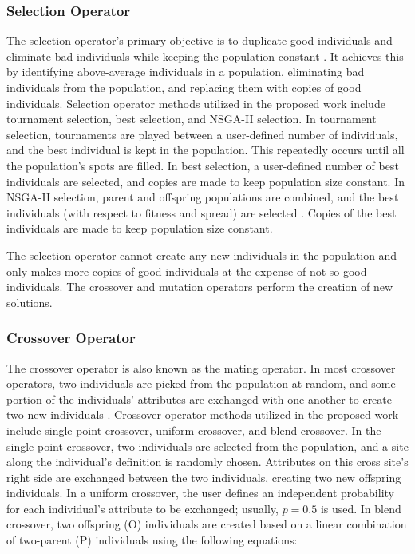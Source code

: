 \subsubsection{Selection Operator}
The selection operator's primary objective is to duplicate good 
individuals and eliminate bad individuals while keeping the population 
constant \cite{deb_multi-objective_2001}. 
It achieves this by identifying above-average individuals in a population, 
eliminating bad individuals from the population, and replacing them with 
copies of good individuals.
Selection operator methods utilized in the proposed work include tournament 
selection, best selection, and NSGA-II selection. 
In tournament selection, tournaments are played between a user-defined number 
of individuals, and the best individual is kept in the population. 
This repeatedly occurs until all the population's spots are filled. 
In best selection, a user-defined number of best individuals are selected, 
and copies are made to keep population size constant. 
In NSGA-II selection, parent and offspring populations are combined, and the
best individuals (with respect to fitness and spread) are selected
\cite{deb_fast_2002}.
Copies of the best individuals are made to keep 
population size constant. 

The selection operator cannot create any new individuals in the population 
and only makes more copies of good individuals at the expense of not-so-good
individuals. 
The crossover and mutation operators perform the creation of new solutions.

\subsubsection{Crossover Operator}
The crossover operator is also known as the mating operator. 
In most crossover operators, two individuals are picked from the population at 
random, and some portion of the individuals' attributes are exchanged with one 
another to create two new individuals \cite{deb_multi-objective_2001}. 
Crossover operator methods utilized in the proposed work include single-point
crossover, uniform crossover, and blend crossover. 
In the single-point crossover, two individuals are selected from the population,
and a site along the individual's definition is randomly chosen. 
Attributes on this cross site's right side are exchanged between the two 
individuals, creating two new offspring individuals.  
In a uniform crossover, the user defines an independent probability for each 
individual's attribute to be exchanged; usually, $p=0.5$ is used. 
In blend crossover, two offspring (O) individuals are created based on a linear 
combination of two-parent (P) individuals using the following equations: 


